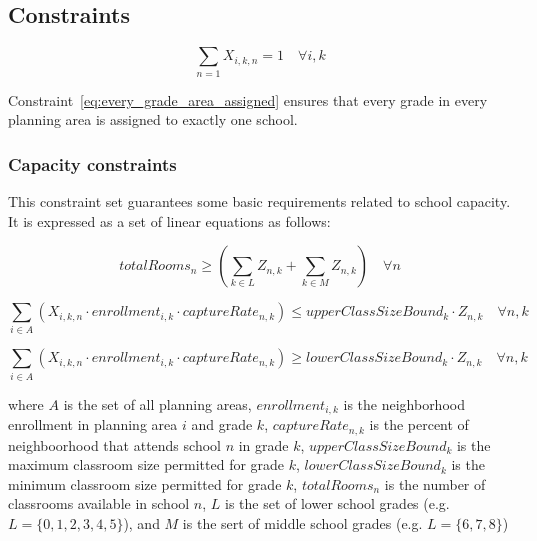 \documentclass[12pt]{article}
\begin{document}
\subsection{Constraints}

\begin{equation} \label{eq:every_grade_area_assigned}
	\displaystyle\sum_{n=1} X_{i,k,n}=1 \quad \forall i,k
\end{equation}

Constraint~\ref{eq:every_grade_area_assigned} ensures that every grade in every planning area is assigned to exactly one school.

\subsubsection*{Capacity constraints}

This constraint set guarantees some basic requirements related to school capacity. It is expressed as a set of linear equations as follows:

\begin{equation} \label{eq:sufficient_rooms}
	totalRooms_{n} \geq (\displaystyle\sum_{k \in L} Z_{n,k} + \displaystyle\sum_{k \in M} Z_{n,k}) \quad \forall n
\end{equation}

\begin{equation} \label{eq:seat_capacity_upper_bound}
	\displaystyle\sum_{i \in A} (X_{i,k,n} \cdot enrollment_{i,k} \cdot captureRate_{n,k}) \leq upperClassSizeBound_{k} \cdot Z_{n,k} \quad \forall n,k
\end{equation}

\begin{equation} \label{eq:seat_capacity_lower_bound}
	\displaystyle\sum_{i \in A} (X_{i,k,n} \cdot enrollment_{i,k} \cdot captureRate_{n,k}) \geq lowerClassSizeBound_{k} \cdot Z_{n,k} \quad \forall n,k
\end{equation}

where $A$ is the set of all planning areas, $enrollment_{i,k}$ is the neighborhood enrollment in planning area $i$ and grade $k$, $captureRate_{n,k}$ is the percent of neighboorhood that attends school $n$ in grade $k$, $upperClassSizeBound_{k}$ is the maximum classroom size permitted for grade $k$, $lowerClassSizeBound_{k}$ is the minimum classroom size permitted for grade $k$, $totalRooms_{n}$ is the number of classrooms available in school $n$, $L$ is the set of lower school grades (e.g. $L=\{0,1,2,3,4,5\}$), and $M$ is the sert of middle school grades (e.g. $L=\{6,7,8\}$)
\end{document}
